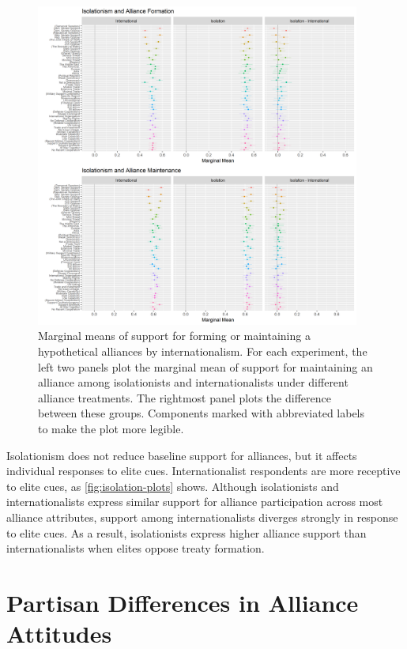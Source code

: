 \documentclass[12pt]{article}
\begin{document}
\begin{figure}
	\centering
		\includegraphics[width=0.95\textwidth]{isolation-plots.png}
	\caption{Marginal means of support for forming or maintaining a hypothetical alliances by internationalism. For each experiment, the left two panels plot the marginal mean of support for maintaining an alliance among isolationists and internationalists under different alliance treatments. The rightmost panel plots the difference between these groups. Components marked with abbreviated labels to make the plot more legible.}
	\label{fig:isolation-plots}
\end{figure}


Isolationism does not reduce baseline support for alliances, but it affects individual responses to elite cues. 
Internationalist respondents are more receptive to elite cues, as \autoref{fig:isolation-plots} shows. 
Although isolationists and internationalists express similar support for alliance participation across most alliance attributes, support among internationalists diverges strongly in response to elite cues. 
As a result, isolationists express higher alliance support than internationalists when elites oppose treaty formation. 




\newpage 



\section{Partisan Differences in Alliance Attitudes}
\end{document}

